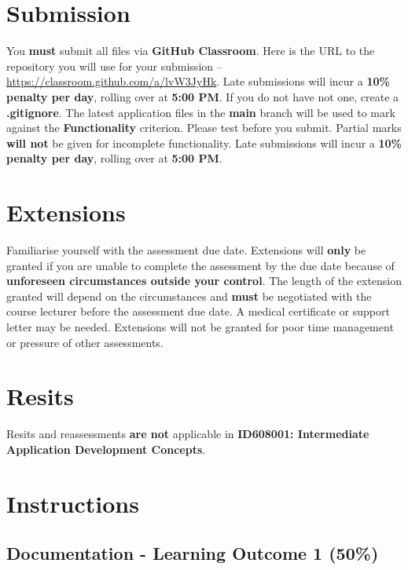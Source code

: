 \documentclass{article}
\begin{document}
\section*{Submission}
You \textbf{must} submit all files via \textbf{GitHub Classroom}. Here is the URL to the repository you will use for your submission – \href{https://classroom.github.com/a/lvW3JyHk}{https://classroom.github.com/a/lvW3JyHk}. Late submissions will incur a \textbf{10\% penalty per day}, rolling over at \textbf{5:00 PM}. If you do not have not one, create a \textbf{.gitignore}. The latest application files in the \textbf{main} branch will be used to mark against the \textbf{Functionality} criterion. Please test before you submit. Partial marks \textbf{will not} be given for incomplete functionality. Late submissions will incur a \textbf{10\% penalty per day}, rolling over at \textbf{5:00 PM}.

\section*{Extensions}
Familiarise yourself with the assessment due date. Extensions will \textbf{only} be granted if you are unable to complete the assessment by the due date because of \textbf{unforeseen circumstances outside your control}. The length of the extension granted will depend on the circumstances and \textbf{must} be negotiated with the course lecturer before the assessment due date. A medical certificate or support letter may be needed. Extensions will not be granted for poor time management or pressure of other assessments.

\section*{Resits}
Resits and reassessments \textbf{are not} applicable in \textbf{ID608001: Intermediate Application Development Concepts}.

\section*{Instructions}

\subsection*{Documentation - Learning Outcome 1 (50\%)}
\end{document}
